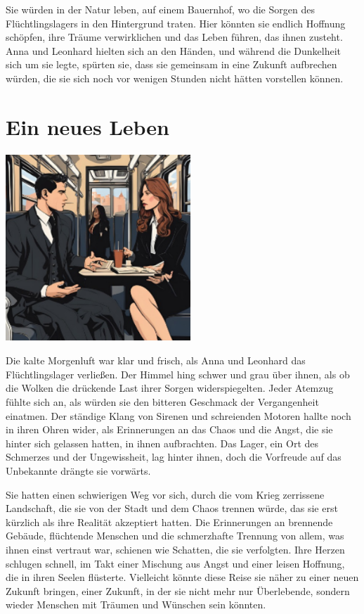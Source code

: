 \documentclass[
]{article}
\begin{document}
Sie würden in der Natur leben, auf einem Bauernhof, wo die Sorgen des
Flüchtlingslagers in den Hintergrund traten. Hier könnten sie endlich
Hoffnung schöpfen, ihre Träume verwirklichen und das Leben führen, das
ihnen zusteht. Anna und Leonhard hielten sich an den Händen, und während
die Dunkelheit sich um sie legte, spürten sie, dass sie gemeinsam in
eine Zukunft aufbrechen würden, die sie sich noch vor wenigen Stunden
nicht hätten vorstellen können.

\section{Ein neues Leben}\label{ein-neues-leben}

\includegraphics[width=2.73958in,height=2.77083in]{media/image3.png}

Die kalte Morgenluft war klar und frisch, als Anna und Leonhard das
Flüchtlingslager verließen. Der Himmel hing schwer und grau über ihnen,
als ob die Wolken die drückende Last ihrer Sorgen widerspiegelten. Jeder
Atemzug fühlte sich an, als würden sie den bitteren Geschmack der
Vergangenheit einatmen. Der ständige Klang von Sirenen und schreienden
Motoren hallte noch in ihren Ohren wider, als Erinnerungen an das Chaos
und die Angst, die sie hinter sich gelassen hatten, in ihnen
aufbrachten. Das Lager, ein Ort des Schmerzes und der Ungewissheit, lag
hinter ihnen, doch die Vorfreude auf das Unbekannte drängte sie
vorwärts.

Sie hatten einen schwierigen Weg vor sich, durch die vom Krieg
zerrissene Landschaft, die sie von der Stadt und dem Chaos trennen
würde, das sie erst kürzlich als ihre Realität akzeptiert hatten. Die
Erinnerungen an brennende Gebäude, flüchtende Menschen und die
schmerzhafte Trennung von allem, was ihnen einst vertraut war, schienen
wie Schatten, die sie verfolgten. Ihre Herzen schlugen schnell, im Takt
einer Mischung aus Angst und einer leisen Hoffnung, die in ihren Seelen
flüsterte. Vielleicht könnte diese Reise sie näher zu einer neuen
Zukunft bringen, einer Zukunft, in der sie nicht mehr nur Überlebende,
sondern wieder Menschen mit Träumen und Wünschen sein könnten.
\end{document}
